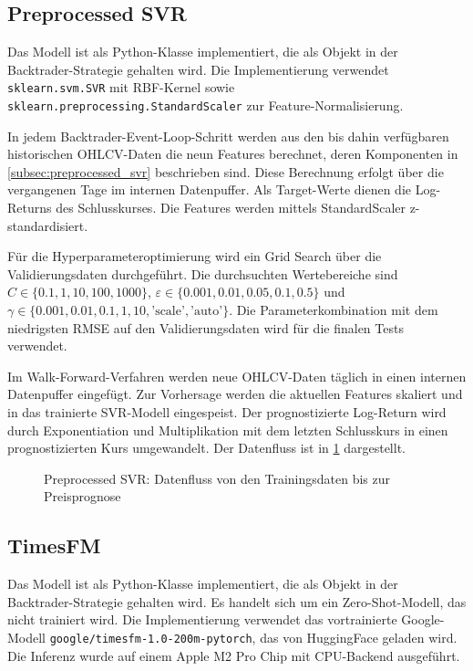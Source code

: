 \subsection{Preprocessed SVR}\label{subsec:impl_preprocessed_svr}
Das Modell ist als Python-Klasse implementiert, die als Objekt in der Backtrader-Strategie gehalten wird. Die Implementierung verwendet \texttt{sklearn.svm.SVR} mit \acs{RBF}-Kernel sowie \texttt{sklearn.preprocessing.StandardScaler} zur Feature-Norma\-lisierung.

In jedem Backtrader-Event-Loop-Schritt werden aus den bis dahin verfügbaren historischen OHLCV-Daten die neun Features berechnet, deren Komponenten in \cref{subsec:preprocessed_svr} beschrieben sind. Diese Berechnung erfolgt über die vergangenen Tage im internen Datenpuffer. Als Target-Werte dienen die Log-Returns des Schlusskurses. Die Features werden mittels StandardScaler z-standardisiert.

Für die Hyperparameteroptimierung wird ein Grid Search über die Validierungsdaten durchgeführt. Die durchsuchten Wertebereiche sind $C \in \{0.1, 1, 10, 100, 1000\}$, $\varepsilon \in \{0.001, 0.01, 0.05, 0.1, 0.5\}$ und $\gamma \in \{0.001, 0.01, 0.1, 1, 10, \text{'scale'}, \text{'auto'}\}$. Die Parameterkombination mit dem niedrigsten \ac{RMSE} auf den Validierungsdaten wird für die finalen Tests verwendet.

Im Walk-Forward-Verfahren werden neue OHLCV-Daten täglich in einen internen Datenpuffer eingefügt. Zur Vorhersage werden die aktuellen Features skaliert und in das trainierte SVR-Modell eingespeist. Der prognostizierte Log-Return wird durch Exponentiation und Multiplikation mit dem letzten Schlusskurs in einen prognostizierten Kurs umgewandelt. Der Datenfluss ist in \cref{fig:svr_prediction_datenfluss} dargestellt.
\begin{figure}[H]
    \centering
    
    \caption{Preprocessed SVR: Datenfluss von den Trainingsdaten bis zur Preisprognose}\label{fig:svr_prediction_datenfluss}
\end{figure}

\subsection{TimesFM}\label{subsec:impl_timesfm}
Das Modell ist als Python-Klasse implementiert, die als Objekt in der Backtrader-Strategie gehalten wird. Es handelt sich um ein Zero-Shot-Modell, das nicht trainiert wird. Die Implementierung verwendet das vortrainierte Google-Modell \texttt{google/timesfm-1.0-200m-py\-torch}, das von HuggingFace geladen wird. Die Inferenz wurde auf einem Apple M2 Pro Chip mit CPU-Backend ausgeführt.

